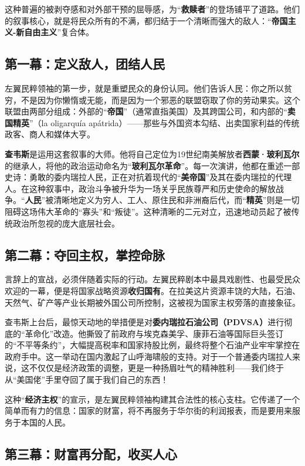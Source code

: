这种普遍的被剥夺感和对外部干预的屈辱感，为“\textbf{救赎者}”的登场铺平了道路。他们的叙事核心，就是将民众所有的不满，都归结于一个清晰而强大的敌人：“\textbf{帝国主义-新自由主义}”复合体。

\subsection{第一幕：定义敌人，团结人民}

左翼民粹领袖的第一步，就是重塑民众的身份认同。他们告诉人民：你之所以贫穷，不是因为你懒惰或无能，而是因为一个邪恶的联盟窃取了你的劳动果实。这个联盟由两部分组成：外部的“\textbf{帝国}”（通常直指美国）及其跨国公司，和内部的“\textbf{卖国精英}”（la oligarquía apátrida）——那些与外国资本勾结、出卖国家利益的传统政客、商人和媒体大亨。

\textbf{查韦斯}是运用这套叙事的大师。他将自己定位为19世纪南美解放者\textbf{西蒙·玻利瓦尔}的继承人，将他的政治运动命名为“\textbf{玻利瓦尔革命}”。每一次演讲，他都在重述一部史诗：勇敢的委内瑞拉人民，正在对抗着现代的“\textbf{美帝国}”及其在委内瑞拉的代理人。在这种叙事中，政治斗争被升华为一场关乎民族尊严和历史使命的解放战争。“\textbf{人民}”被清晰地定义为穷人、工人、原住民和非洲裔后代，而“\textbf{精英}”则是一切阻碍这场伟大革命的“寡头”和“叛徒”。这种清晰的二元对立，迅速地动员起了被传统政治所忽视的庞大底层社会。

\subsection{第二幕：夺回主权，掌控命脉}

言辞上的宣战，必须伴随着实际的行动。左翼民粹剧本中最具戏剧性、也最受民众欢迎的一幕，便是将国家战略资源\textbf{收归国有}。在拉美这片资源丰饶的大陆，石油、天然气、矿产等产业长期被外国公司所控制，这被视为国家主权旁落的直接象征。

查韦斯上台后，最惊天动地的举措便是对\textbf{委内瑞拉石油公司（PDVSA）}进行彻底的“革命化”改造。他撕毁了前政府与埃克森美孚、康菲石油等国际巨头签订的“不平等条约”，大幅提高税率和国家持股比例，最终将整个石油产业牢牢掌控在政府手中。这一举动在国内激起了山呼海啸般的支持。对于一个普通委内瑞拉人来说，这不仅仅是经济政策的调整，更是一种扬眉吐气的精神胜利——我们终于从“美国佬”手里夺回了属于我们自己的东西！

这种“\textbf{经济主权}”的宣示，是左翼民粹领袖构建其合法性的核心支柱。它传递了一个简单而有力的信息：国家的财富，将不再服务于华尔街的利润报表，而是要用来服务于本国的人民。

\subsection{第三幕：财富再分配，收买人心}

